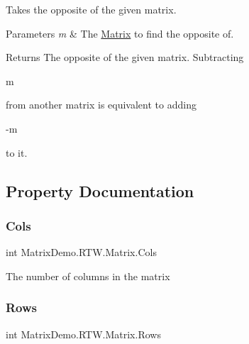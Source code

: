 Takes the opposite of the given matrix. 


\begin{DoxyParams}{Parameters}
{\em m} & The \mbox{\hyperlink{class_matrix_demo_1_1_r_t_w_1_1_matrix}{Matrix}} to find the opposite of.\\
\hline
\end{DoxyParams}
\begin{DoxyReturn}{Returns}
The opposite of the given matrix. Subtracting 
\begin{DoxyCode}
m
\end{DoxyCode}
 from another matrix is equivalent to adding 
\begin{DoxyCode}
-m
\end{DoxyCode}
 to it.
\end{DoxyReturn}


\subsection{Property Documentation}
\mbox{\label{class_matrix_demo_1_1_r_t_w_1_1_matrix_a7b412909ff1b6c6b9c9af57314dff52b}} 
\subsubsection{\texorpdfstring{Cols}{Cols}}
{\footnotesize\ttfamily int Matrix\+Demo.\+R\+T\+W.\+Matrix.\+Cols\hspace{0.3cm}{\ttfamily [get]}}



The number of columns in the matrix 

\mbox{\label{class_matrix_demo_1_1_r_t_w_1_1_matrix_a9596bae43484cf8c21729237297b4744}} 
\subsubsection{\texorpdfstring{Rows}{Rows}}
{\footnotesize\ttfamily int Matrix\+Demo.\+R\+T\+W.\+Matrix.\+Rows\hspace{0.3cm}{\ttfamily [get]}}




